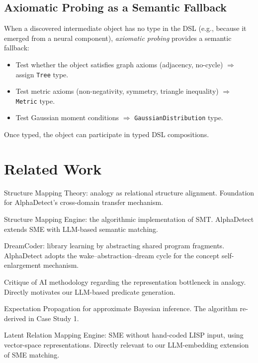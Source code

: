 \documentclass[12pt,a4paper]{article}
\begin{document}
\subsection{Axiomatic Probing as a Semantic Fallback}

When a discovered intermediate object has no type in the DSL (e.g., because it
emerged from a neural component), \emph{axiomatic probing} provides a semantic
fallback:
\begin{itemize}[itemsep=0pt]
  \item Test whether the object satisfies graph axioms (adjacency, no-cycle) $\Rightarrow$ assign \texttt{Tree} type.
  \item Test metric axioms (non-negativity, symmetry, triangle inequality) $\Rightarrow$ \texttt{Metric} type.
  \item Test Gaussian moment conditions $\Rightarrow$ \texttt{GaussianDistribution} type.
\end{itemize}
Once typed, the object can participate in typed DSL compositions.

\section{Related Work}
\label{sec:related}

\begin{description}[leftmargin=0em, labelwidth=0em, itemsep=4pt]
  \item[Gentner (1983) \cite{gentner1983}]
    Structure Mapping Theory: analogy as relational structure alignment.
    Foundation for AlphaDetect's cross-domain transfer mechanism.

  \item[Falkenhainer, Forbus \& Gentner (1989) \cite{falkenhainer1989}]
    Structure Mapping Engine: the algorithmic implementation of SMT.
    AlphaDetect extends SME with LLM-based semantic matching.

  \item[Ellis et al.\ (2021) \cite{dreamcoder2021}]
    DreamCoder: library learning by abstracting shared program fragments.
    AlphaDetect adopts the wake--abstraction--dream cycle for the
    concept self-enlargement mechanism.

  \item[Chalmers, French \& Hofstadter (1992) \cite{chalmers1992}]
    Critique of AI methodology regarding the representation bottleneck in
    analogy.  Directly motivates our LLM-based predicate generation.

  \item[Minka (2001) \cite{minka2001}]
    Expectation Propagation for approximate Bayesian inference.
    The algorithm re-derived in Case Study 1.

  \item[Turney (2008) \cite{turney2008}]
    Latent Relation Mapping Engine: SME without hand-coded LISP input,
    using vector-space representations.  Directly relevant to our
    LLM-embedding extension of SME matching.
\end{description}
\end{document}
